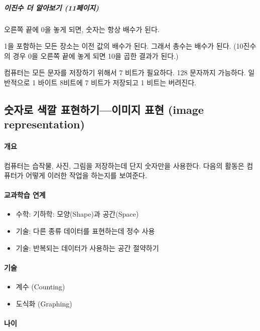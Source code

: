 \documentclass[]{article}
\begin{document}
\subparagraph{이진수 더 알아보기 (11페이지)}\label{section-26}

오른쪽 끝에 0을 놓게 되면, 숫자는 항상 배수가 된다.

1을 포함하는 모든 장소는 이전 값의 배수가 된다. 그래서 총수는 배수가
된다. (10진수의 경우 0을 오른쪽 끝에 놓게 되면 10을 곱한 결과가 된다.)

컴퓨터는 모든 문자를 저장하기 위해서 7 비트가 필요하다. 128 문자까지
가능하다. 일반적으로 1 바이트 8비트에 7 비트가 저장되고 1 비트는
버려진다.

\subsection{숫자로 색깔 표현하기---이미지 표현 (image
representation)}\label{mdash--image-representation}

\mbox{}\paragraph{개요}\label{section-27}

컴퓨터는 습작물, 사진, 그림을 저장하는데 단지 숫자만을 사용한다. 다음의
활동은 컴퓨터가 어떻게 이러한 작업을 하는지를 보여준다.

\mbox{}\paragraph{교과학습 연계}\label{section-28}

\begin{itemize}
\itemsep1pt\parskip0pt
\item
  수학: 기하학: 모양(Shape)과 공간(Space)
\item
  기술: 다른 종류 데이터를 표현하는데 정수 사용
\item
  기술: 반복되는 데이터가 사용하는 공간 절약하기
\end{itemize}

\mbox{}\paragraph{기술}\label{section-29}

\begin{itemize}
\itemsep1pt\parskip0pt
\item
  계수 (Counting)
\item
  도식화 (Graphing)
\end{itemize}

\mbox{}\paragraph{나이}\label{section-30}
\end{document}
